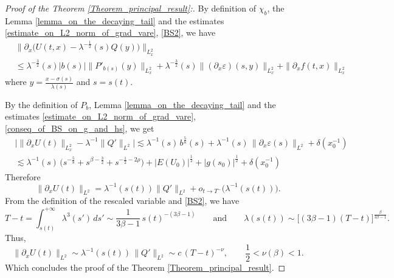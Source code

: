 \documentclass[16pt,english, oneside,reqno]{smfart}
\newcommand{\vare}{{\varepsilon}}
\begin{document}
\vspace{0.4cm}
\begin{proof}[Proof of the Theorem \ref{Theorem_principal_result}:]
By definition of $\chi_b$, the Lemma \ref{lemma_on_the_decaying_tail} and the estimates \eqref{estimate_on_L2_norm_of_grad_vare}, \eqref{BS2}, we have
\begin{equation}
\begin{split}
    &\Big\| \partial_x\Big( U(t,x) - \lambda^{-\frac12}(s)Q(y)  \Big) \Big\|_{L^2_x}\\ 
    &\leq 
    \lambda^{-\frac 32}(s)|b(s)|\|P'_{b(s)}(y)\|_{L^2_x} + \lambda^{-\frac32}(s)\| (\partial_x \vare)(s,y) \|_{L^2_x} + \|\partial_x f(t,x)\|_{L^2_x}
 \end{split}  
\end{equation}
where $y = \frac{x-\sigma(s)}{\lambda(s)}$ and $s = s(t)$.

By the definition of $P_b$, Lemma \ref{lemma_on_the_decaying_tail} and the estimates \eqref{estimate_on_L2_norm_of_grad_vare}, \eqref{conseq_of_BS_on_g_and_hs}, we get 
\begin{equation}
\begin{split}
    &\Big| \|\partial_x U(t)\|_{L^2_x} - \lambda^{-1}\|Q'\|_{L^2} \Big|\lesssim \lambda^{-1}(s)\,b^{\frac 58}(s)+ \lambda^{-1}(s)\,\|\partial_x \vare(s)\|_{L^2} + \delta(x^{-1}_0)\\
    &\lesssim
    \lambda^{-1}(s)\,\big( s^{-\frac 58} + s^{\beta-\frac 32} + s^{-\frac 12 - 2\rho} \big) + |E(U_0)|^{\frac 12} + |g(s_0)|^{\frac 12} + \delta(x^{-1}_0)
  \end{split} 
\end{equation}
Therefore
\begin{equation}
    \|\partial_x U(t)\|_{L^2} = \lambda^{-1}(s(t))\|Q'\|_{L^2} + o_{t \to T^{-}}\big(\lambda^{-1}(s(t))\big).
\end{equation}
From the definition of the rescaled variable and \eqref{BS2}, we have
    \begin{equation}
        T-t = \int^{+\infty}_{s(t)} \lambda^3(s')\,ds' \sim \frac{1}{3\beta-1}\,s(t)^{-(3\beta-1)} \qquad\text{and}\qquad \lambda(s(t))\sim \big[ (3\beta-1)(T-t) \big]^{\frac{\beta}{3\beta-1}}.
    \end{equation}
Thus,
\begin{equation}
    \|\partial_x U(t)\|_{L^2} \sim \lambda^{-1}(s(t))\,\|Q'\|_{L^2} \sim c\, (T-t)^{-\nu}, \qquad \frac 12 <\nu(\beta) < 1.
\end{equation}
Which concludes the proof of the Theorem \ref{Theorem_principal_result}.
\end{proof}
\end{document}
